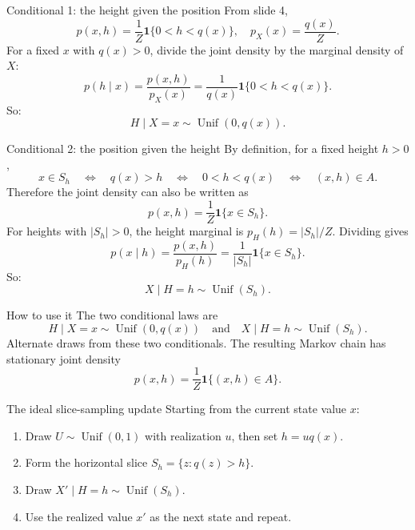 \documentclass[aspectratio=169,11pt]{beamer}
\begin{document}
\begin{frame}{Conditional 1: the height given the position}
  From slide 4,
  \[
    p(x,h)=\frac{1}{Z}\mathbf 1\{0<h<q(x)\},\quad
    p_X(x)=\frac{q(x)}{Z}.
  \]
  For a fixed \(x\) with \(q(x)>0\), divide the joint density
  by the marginal density of \(X\):
  \[
    p(h\mid x)=\frac{p(x,h)}{p_X(x)}
      =\frac{1}{q(x)}\mathbf 1\{0<h<q(x)\}.
  \]
  So:
  \[
    H\mid X=x\sim \operatorname{Unif}(0,q(x)).
  \]
\end{frame}

\begin{frame}{Conditional 2: the position given the height}
  By definition, for a fixed height \(h>0\),
  \[
    x\in S_h\quad\Longleftrightarrow\quad q(x)>h
      \quad\Longleftrightarrow\quad 0<h<q(x)
      \quad\Longleftrightarrow\quad (x,h)\in A.
  \]
  Therefore the joint density can also be written as
  \[
    p(x,h)=\frac{1}{Z}\mathbf 1\{x\in S_h\}.
  \]
  For heights with \(|S_h|>0\), the height marginal is
  \(p_H(h)=|S_h|/Z\). Dividing gives
  \[
    p(x\mid h)=\frac{p(x,h)}{p_H(h)}
      =\frac{1}{|S_h|}\mathbf 1\{x\in S_h\}.
  \]
  So:
  \[
    X\mid H=h\sim \operatorname{Unif}(S_h).
  \]
\end{frame}

\begin{frame}{How to use it}
  The two conditional laws are
  \[
    H\mid X=x\sim \operatorname{Unif}(0,q(x))\quad\text{and}\quad
    X\mid H=h\sim \operatorname{Unif}(S_h).
  \]
  Alternate draws from these two conditionals. The resulting Markov
  chain has stationary joint density
  \[
    p(x,h)=\frac{1}{Z}\mathbf 1\{(x,h)\in A\}.
  \]
\end{frame}

\begin{frame}{The ideal slice-sampling update}
  Starting from the current state value \(x\):
  \begin{enumerate}
    \setlength{\itemsep}{0.65em}
    \item Draw \(U\sim \operatorname{Unif}(0,1)\) with realization \(u\),
          then set \(h=uq(x)\).
    \item Form the horizontal slice \(S_h=\{z:q(z)>h\}\).
    \item Draw \(X'\mid H=h\sim \operatorname{Unif}(S_h)\).
    \item Use the realized value \(x'\) as the next state and repeat.
  \end{enumerate}
\end{frame}
\end{document}
